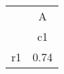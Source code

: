 \begin{tabular}{l*{1}{c}}
\hline\hline
            &           A\\
            &          c1\\
\hline
r1          &        0.74\\
\hline\hline
\end{tabular}
